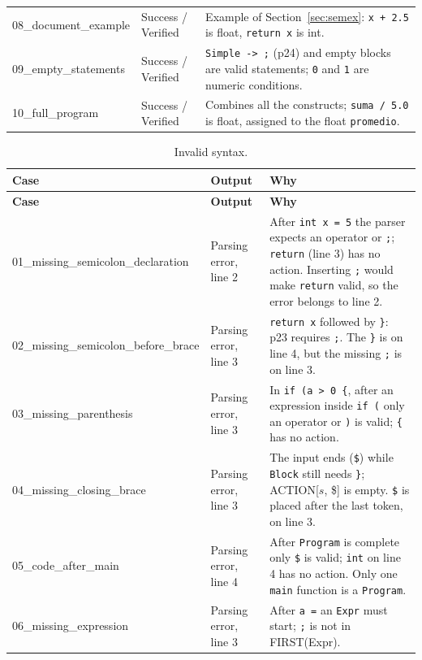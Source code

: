 \documentclass[11pt,letterpaper]{article}
\newcommand{\tok}[1]{\texttt{#1}}
\begin{document}
{\begin{longtable}{@{}p{3.6cm}p{2.9cm}p{8.6cm}@{}}
08\_\allowbreak{}document\_\allowbreak{}example & Success / Verified & Example of Section~\ref{sec:semex}: \texttt{x + 2.5} is float, \texttt{return x} is int. \\
09\_\allowbreak{}empty\_\allowbreak{}statements & Success / Verified & \texttt{Simple -> ;} (p24) and empty blocks are valid statements; \texttt{0} and \texttt{1} are numeric conditions. \\
10\_\allowbreak{}full\_\allowbreak{}program & Success / Verified & Combines all the constructs; \texttt{suma / 5.0} is float, assigned to the float \texttt{promedio}. \\
\bottomrule
\end{longtable}

\begin{longtable}{@{}p{3.6cm}p{2.9cm}p{8.6cm}@{}}
\caption{Invalid syntax.}\\
\toprule
\textbf{Case} & \textbf{Output} & \textbf{Why}\\
\midrule
\endfirsthead
\toprule
\textbf{Case} & \textbf{Output} & \textbf{Why}\\
\midrule
\endhead
01\_\allowbreak{}missing\_\allowbreak{}semicolon\_\allowbreak{}declaration & Parsing error, line 2 & After \texttt{int x = 5} the parser expects an operator or \tok{;}; \tok{return} (line 3) has no action. Inserting \tok{;} would make \tok{return} valid, so the error belongs to line 2. \\
02\_\allowbreak{}missing\_\allowbreak{}semicolon\_\allowbreak{}before\_\allowbreak{}brace & Parsing error, line 3 & \texttt{return x} followed by \tok{\}}: p23 requires \tok{;}. The \tok{\}} is on line 4, but the missing \tok{;} is on line 3. \\
03\_\allowbreak{}missing\_\allowbreak{}parenthesis & Parsing error, line 3 & In \texttt{if (a > 0 \{}, after an expression inside \texttt{if (} only an operator or \tok{)} is valid; \tok{\{} has no action. \\
04\_\allowbreak{}missing\_\allowbreak{}closing\_\allowbreak{}brace & Parsing error, line 3 & The input ends (\tok{\$}) while \texttt{Block} still needs \tok{\}}; ACTION[$s$, \$] is empty. \tok{\$} is placed after the last token, on line 3. \\
05\_\allowbreak{}code\_\allowbreak{}after\_\allowbreak{}main & Parsing error, line 4 & After \texttt{Program} is complete only \tok{\$} is valid; \tok{int} on line 4 has no action. Only one \texttt{main} function is a \texttt{Program}. \\
06\_\allowbreak{}missing\_\allowbreak{}expression & Parsing error, line 3 & After \texttt{a =} an \texttt{Expr} must start; \tok{;} is not in FIRST(Expr). \\

\end{longtable}}
\end{document}
